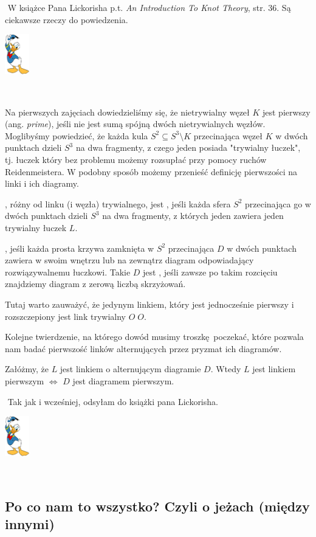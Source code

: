 \documentclass{article}
\renewenvironment{proof}{{\bfseries\color{orange} Dowód}$ $\newline}{
  \begin{flushright}\includegraphics[width=30pt]{Donald_Duck.png}\end{flushright}$ $\newline
}
\begin{document}
\begin{proof}
  W książce Pana Lickorisha p.t. \emph{An Introduction To Knot Theory}, str. 36. Są ciekawsze rzeczy do powiedzenia.
\end{proof}

Na pierwszych zajęciach dowiedzieliśmy się, że nietrywialny węzeł $K$ jest pierwszy (ang. \emph{prime}), jeśli nie jest sumą spójną dwóch nietrywialnych węzłów. Moglibyśmy powiedzieć, że każda kula $S^2\subseteq S^3\setminus K$ przecinająca węzeł $K$ w dwóch punktach dzieli $S^3$ na dwa fragmenty, z czego jeden posiada "trywialny łuczek", tj. łuczek który bez problemu możemy rozsupłać przy pomocy ruchów Reidenmeistera. W podobny sposób możemy przenieść definicję pierwszości na linki i ich diagramy.

\begin{deff}
  , różny od linku (i węzła) trywialnego, jest , jeśli każda sfera $S^2$ przecinająca go w dwóch punktach dzieli $S^3$ na dwa fragmenty, z których jeden zawiera jeden trywialny łuczek $L$.

  , jeśli każda prosta krzywa zamknięta w $S^2$ przecinająca $D$ w dwóch punktach zawiera w swoim wnętrzu lub na zewnątrz diagram odpowiadający rozwiązywalnemu łuczkowi. Takie $D$ jest , jeśli zawsze po takim rozcięciu znajdziemy diagram z zerową liczbą skrzyżowań. 
\end{deff}

Tutaj warto zauważyć, że jedynym linkiem, który jest jednocześnie pierwszy i rozszczepiony jest link trywialny $O\;O$.

Kolejne twierdzenie, na którego dowód musimy troszkę poczekać, które pozwala nam badać pierwszość linków alternujących przez pryzmat ich diagramów.
\begin{thm}
  Załóżmy, że $L$ jest linkiem o alternującym diagramie $D$. Wtedy $L$ jest linkiem pierwszym $\iff$ $D$ jest diagramem pierwszym.
\end{thm}

\begin{proof}
  Tak jak i wcześniej, odsyłam do książki pana Lickorisha.
\end{proof}

\subsection{Po co nam to wszystko? Czyli o jeżach (między innymi)}
\end{document}
